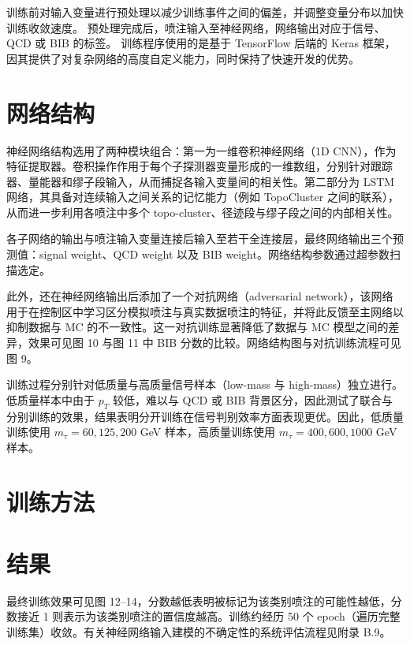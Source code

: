 训练前对输入变量进行预处理以减少训练事件之间的偏差，并调整变量分布以加快训练收敛速度。
预处理完成后，喷注输入至神经网络，网络输出对应于信号、QCD 或 BIB 的标签。
训练程序使用的是基于 TensorFlow 后端的 Keras 框架，因其提供了对复杂网络的高度自定义能力，同时保持了快速开发的优势。


\section{网络结构}
神经网络结构选用了两种模块组合：第一为一维卷积神经网络（1D CNN），作为特征提取器。卷积操作作用于每个子探测器变量形成的一维数组，分别针对跟踪器、量能器和缪子段输入，从而捕捉各输入变量间的相关性。第二部分为 LSTM 网络，其具备对连续输入之间关系的记忆能力（例如 TopoCluster 之间的联系），从而进一步利用各喷注中多个 topo-cluster、径迹段与缪子段之间的内部相关性。

各子网络的输出与喷注输入变量连接后输入至若干全连接层，最终网络输出三个预测值：signal weight、QCD weight 以及 BIB weight。网络结构参数通过超参数扫描选定。

此外，还在神经网络输出后添加了一个对抗网络（adversarial network），该网络用于在控制区中学习区分模拟喷注与真实数据喷注的特征，并将此反馈至主网络以抑制数据与 MC 的不一致性。这一对抗训练显著降低了数据与 MC 模型之间的差异，效果可见图 10 与图 11 中 BIB 分数的比较。网络结构图与对抗训练流程可见图 9。

训练过程分别针对低质量与高质量信号样本（low-mass 与 high-mass）独立进行。低质量样本中由于 $p_T$ 较低，难以与 QCD 或 BIB 背景区分，因此测试了联合与分别训练的效果，结果表明分开训练在信号判别效率方面表现更优。因此，低质量训练使用 $m_\tau = 60, 125, 200$ GeV 样本，高质量训练使用 $m_\tau = 400, 600, 1000$ GeV 样本。


\section{训练方法}


\section{结果}
最终训练效果可见图 12--14，分数越低表明被标记为该类别喷注的可能性越低，分数接近 1 则表示为该类别喷注的置信度越高。训练约经历 50 个 epoch（遍历完整训练集）收敛。有关神经网络输入建模的不确定性的系统评估流程见附录 B.9。

